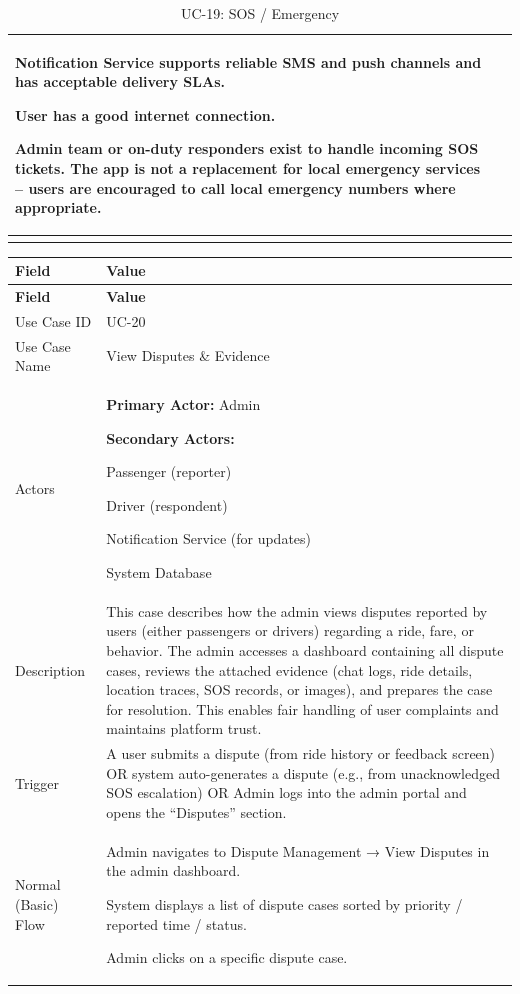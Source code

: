 \begin{longtable}{|p{3.5cm}|p{12cm}|}
Notification Service supports reliable SMS and push channels and has acceptable delivery SLAs.

User has a good internet connection.

Admin team or on-duty responders exist to handle incoming SOS tickets. The app is not a replacement for local emergency services – users are encouraged to call local emergency numbers where appropriate. \\
\hline
\caption{UC-19: SOS / Emergency}
\end{longtable}

\begin{longtable}{|p{3.5cm}|p{12cm}|}
\hline
\rowcolor{lightgray!30}
\textbf{Field} & \textbf{Value} \\
\hline
\endfirsthead
\hline
\rowcolor{lightgray!30}
\textbf{Field} & \textbf{Value} \\
\hline
\endhead
\hline
\endfoot
Use Case ID & UC-20 \\
\hline
Use Case Name & View Disputes \& Evidence \\
\hline
Actors &
\textbf{Primary Actor:} Admin

\textbf{Secondary Actors:}

Passenger (reporter)

Driver (respondent)

Notification Service (for updates)

System Database \\
\hline
Description &
This case describes how the admin views disputes reported by users (either passengers or drivers) regarding a ride, fare, or behavior. The admin accesses a dashboard containing all dispute cases, reviews the attached evidence (chat logs, ride details, location traces, SOS records, or images), and prepares the case for resolution. This enables fair handling of user complaints and maintains platform trust. \\
\hline
Trigger &
A user submits a dispute (from ride history or feedback screen) OR system auto-generates a dispute (e.g., from unacknowledged SOS escalation) OR Admin logs into the admin portal and opens the “Disputes” section. \\
\hline
Normal (Basic) Flow &
Admin navigates to Dispute Management → View Disputes in the admin dashboard.

System displays a list of dispute cases sorted by priority / reported time / status.

Admin clicks on a specific dispute case.


\end{longtable}
